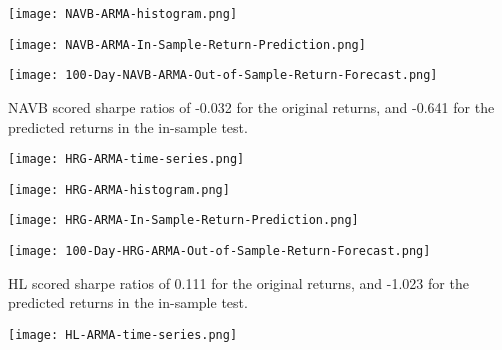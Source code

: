 \begin{center}
    \texttt{[image: NAVB-ARMA-histogram.png]}
    \label{fig:nonfloat}
\end{center}

\begin{center}  
    \texttt{[image: NAVB-ARMA-In-Sample-Return-Prediction.png]}
    \label{fig:nonfloat}
\end{center}

\begin{center}  
    \texttt{[image: 100-Day-NAVB-ARMA-Out-of-Sample-Return-Forecast.png]}
    \label{fig:nonfloat}
\end{center}

NAVB scored sharpe ratios of -0.032 for the original returns, and -0.641 for the predicted returns in the in-sample test.

\begin{center}
    \texttt{[image: HRG-ARMA-time-series.png]}
    \label{fig:nonfloat}
\end{center}

\begin{center}
    \texttt{[image: HRG-ARMA-histogram.png]}
    \label{fig:nonfloat}
\end{center}

\begin{center}
    \texttt{[image: HRG-ARMA-In-Sample-Return-Prediction.png]}
    \label{fig:nonfloat}
\end{center}

\begin{center}
    \texttt{[image: 100-Day-HRG-ARMA-Out-of-Sample-Return-Forecast.png]}
    \label{fig:nonfloat}
\end{center}

HL scored sharpe ratios of 0.111 for the original returns, and -1.023 for the predicted returns in the in-sample test.

\begin{center}
  
    \texttt{[image: HL-ARMA-time-series.png]}
    \label{fig:nonfloat}
\end{center}

